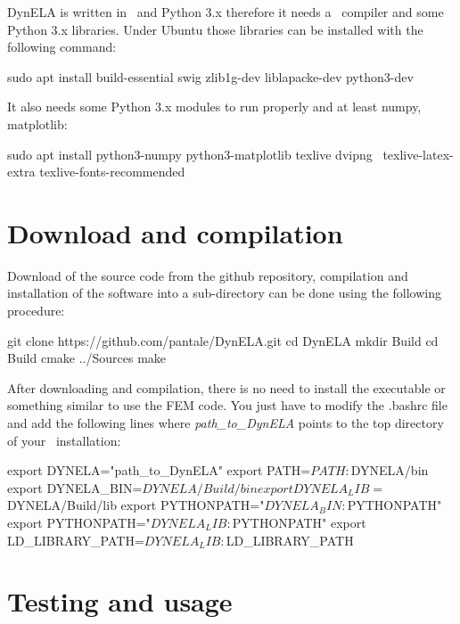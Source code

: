 DynELA is written in \Cpp~and Python 3.x therefore it needs a \Cpp~compiler and some Python 3.x libraries. Under Ubuntu those libraries can be installed with the following command:

\begin{BashListing}[numbers=none]
sudo apt install build-essential swig zlib1g-dev liblapacke-dev python3-dev
\end{BashListing}

It also needs some Python 3.x modules to run properly and at least numpy, matplotlib:

\begin{BashListing}[numbers=none]
sudo apt install python3-numpy python3-matplotlib texlive dvipng \
texlive-latex-extra texlive-fonts-recommended
\end{BashListing}

\section{Download and compilation}

Download of the source code from the github repository, compilation and installation of the software into a sub-directory can be done using the following procedure:

\begin{BashListing}[numbers=none]
git clone https://github.com/pantale/DynELA.git
cd DynELA
mkdir Build
cd Build
cmake ../Sources
make
\end{BashListing}

After downloading and compilation, there is no need to install the executable or something similar to use the FEM code. You just have to modify the \textsf{.bashrc} file and add the following lines where \emph{path\_to\_DynELA} points to the top directory of your \DynELA~installation:

\begin{BashListing}[numbers=none]
export DYNELA="path_to_DynELA"
export PATH=$PATH:$DYNELA/bin
export DYNELA_BIN=$DYNELA/Build/bin
export DYNELA_LIB=$DYNELA/Build/lib
export PYTHONPATH="$DYNELA_BIN:$PYTHONPATH"
export PYTHONPATH="$DYNELA_LIB:$PYTHONPATH"
export LD_LIBRARY_PATH=$DYNELA_LIB:$LD_LIBRARY_PATH
\end{BashListing}

\section{Testing and usage}

